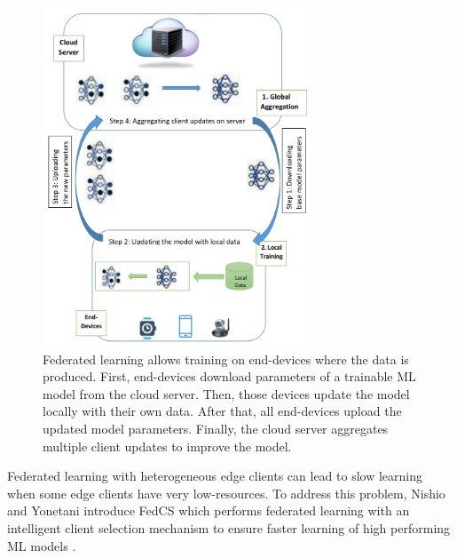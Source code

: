\documentclass[letterpaper, 10 pt, conference]{ieeeconf}
\begin{document}
\begin{figure}[bh] 
	\centerline{\includegraphics[width=8cm]{FederatedLearning.png}}
	\vspace*{8pt}
	\caption{Federated learning allows training on end-devices where the data is produced. First, end-devices download parameters of a trainable ML model from the cloud server. Then, those devices update the model locally with their own data. After that, all end-devices upload the updated model parameters. Finally, the cloud server aggregates multiple client updates to improve the model.}
\end{figure}
Federated learning with heterogeneous edge clients can lead to slow learning when some edge clients have very low-resources. To address this problem, Nishio and Yonetani introduce FedCS which performs federated learning with an intelligent client selection mechanism to ensure faster learning of high performing ML models \cite{Nishio_Yonetani_2018}.
\end{document}

